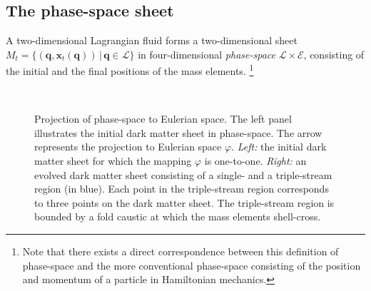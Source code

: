 \documentclass[a4paper, 11pt]{article}
\begin{document}
\subsection{The phase-space sheet}
A two-dimensional Lagrangian fluid forms a two-dimensional sheet $M_t=\{(\bm{q},\bm{x}_t(\bm{q})) \, |\, \bm{q}\in \mathcal{L}\}$ in four-dimensional \textit{phase-space} $\mathcal{L}\times \mathcal{E}$, consisting of the initial and the final positions of the mass elements. \footnote{Note that there exists a direct correspondence between this definition of phase-space and the more conventional phase-space consisting of the position and momentum of a particle in Hamiltonian mechanics.} 
\begin{figure}
\centering
\begin{subfigure}[b]{0.49\textwidth}
\end{subfigure}~
\begin{subfigure}[b]{0.49\textwidth}
\end{subfigure}
\caption{Projection of phase-space to Eulerian space. The left panel illustrates the initial dark matter sheet in phase-space. The arrow represents the projection to Eulerian space $\varphi$. \textit{Left:} the initial dark matter sheet for which the mapping $\varphi$ is one-to-one. \textit{Right:} an evolved dark matter sheet consisting of a single- and a triple-stream region (in blue). Each point in the triple-stream region corresponds to three points on the dark matter sheet. The triple-stream region is bounded by a fold caustic at which the mass elements shell-cross.}\label{fig:Phase-Space}
\end{figure}
\end{document}
